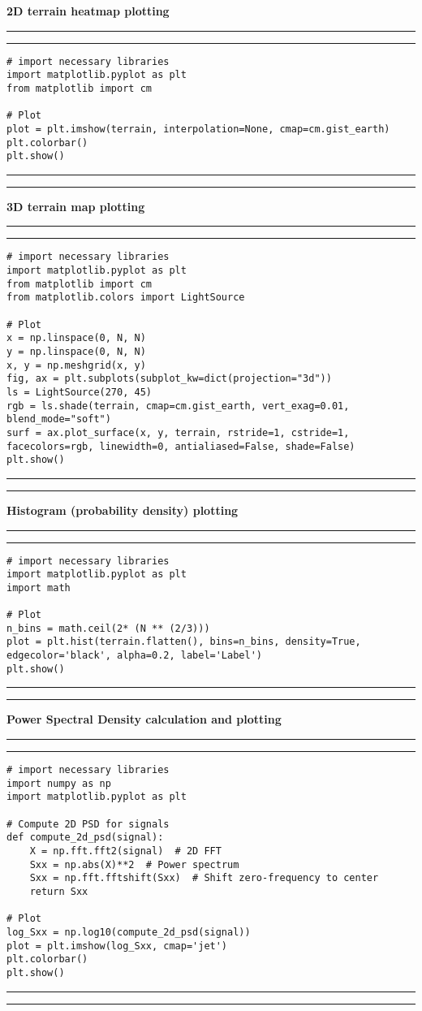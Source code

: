 \textbf{\large{2D terrain heatmap plotting}}
\vspace{2.5pt}
\hrule
\vspace{1mm}
\hrule
\begin{lstlisting}
# import necessary libraries
import matplotlib.pyplot as plt
from matplotlib import cm

# Plot
plot = plt.imshow(terrain, interpolation=None, cmap=cm.gist_earth)
plt.colorbar()
plt.show()
\end{lstlisting}
\hrule
\vspace{1mm}
\hrule
\vspace{5mm}

\textbf{\large{3D terrain map plotting}}
\vspace{2.5pt}
\hrule
\vspace{1mm}
\hrule
\begin{lstlisting}
# import necessary libraries
import matplotlib.pyplot as plt
from matplotlib import cm
from matplotlib.colors import LightSource

# Plot
x = np.linspace(0, N, N)
y = np.linspace(0, N, N)
x, y = np.meshgrid(x, y)
fig, ax = plt.subplots(subplot_kw=dict(projection="3d"))
ls = LightSource(270, 45)
rgb = ls.shade(terrain, cmap=cm.gist_earth, vert_exag=0.01, blend_mode="soft")
surf = ax.plot_surface(x, y, terrain, rstride=1, cstride=1, facecolors=rgb, linewidth=0, antialiased=False, shade=False)
plt.show()
\end{lstlisting}
\hrule
\vspace{1mm}
\hrule
\vspace{5mm}

\textbf{\large{Histogram (probability density) plotting}}
\vspace{2.5pt}
\hrule
\vspace{1mm}
\hrule
\begin{lstlisting}
# import necessary libraries
import matplotlib.pyplot as plt
import math

# Plot
n_bins = math.ceil(2* (N ** (2/3)))
plot = plt.hist(terrain.flatten(), bins=n_bins, density=True, edgecolor='black', alpha=0.2, label='Label')
plt.show()
\end{lstlisting}
\hrule
\vspace{1mm}
\hrule
\vspace{5mm}

\textbf{\large{Power Spectral Density calculation and plotting}}
\vspace{2.5pt}
\hrule
\vspace{1mm}
\hrule
\begin{lstlisting}
# import necessary libraries
import numpy as np
import matplotlib.pyplot as plt

# Compute 2D PSD for signals
def compute_2d_psd(signal):
    X = np.fft.fft2(signal)  # 2D FFT
    Sxx = np.abs(X)**2  # Power spectrum
    Sxx = np.fft.fftshift(Sxx)  # Shift zero-frequency to center
    return Sxx

# Plot
log_Sxx = np.log10(compute_2d_psd(signal))
plot = plt.imshow(log_Sxx, cmap='jet')
plt.colorbar()
plt.show()
\end{lstlisting}
\hrule
\vspace{1mm}
\hrule
\vspace{5mm}

